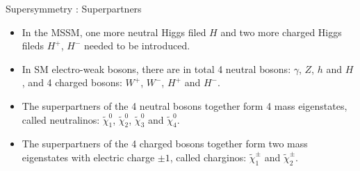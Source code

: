 \documentclass[mathserif,serif]{beamer}
\begin{document}
\begin{frame}{Supersymmetry : Superpartners}
\begin{itemize}
\item In the MSSM, one more neutral Higgs filed $H$ and two more charged Higgs fileds $H^+$, $H^-$ needed to be introduced.
\item In SM electro-weak bosons, there are in total 4 neutral bosons: $\gamma$, $Z$, $h$ and $H$, and 4 charged bosons: $W^+$, $W^-$, $H^+$ and $H^-$.
\item The superpartners of the 4 neutral bosons together form 4 mass eigenstates, called neutralinos: $\tilde{\chi}_1^0$, $\tilde{\chi}_2^0$, $\tilde{\chi}_3^0$ and $\tilde{\chi}_4^0$.
\item The superpartners of the 4 charged bosons together form two mass eigenstates with electric charge $\pm 1$, called charginos: $\tilde{\chi}_1^\pm$ and $\tilde{\chi}_2^\pm$.
\end{itemize}

\begin{table}[htbp]
\tiny
\centering
{}
\caption{\scriptsize The spin and R-parity for the Standard Model particles and their superpartners.}
\end{table}

\end{frame}
\end{document}
